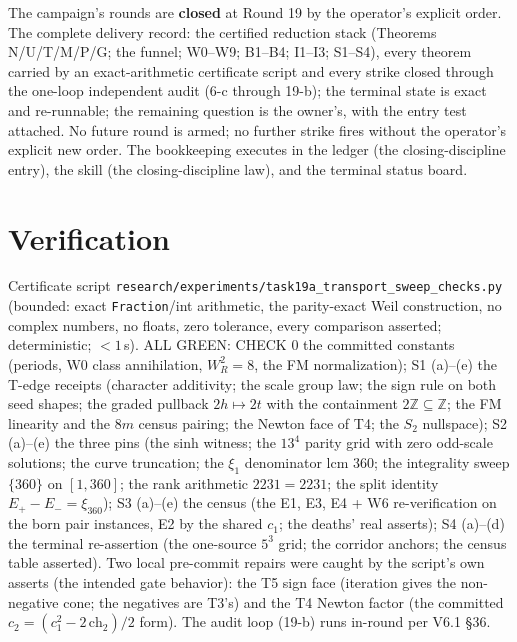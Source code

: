 \documentclass[11pt]{article}
\begin{document}
The campaign's rounds are \textbf{closed} at Round 19 by the operator's
explicit order. The complete delivery record: the certified reduction stack
(Theorems N/U/T/M/P/G; the funnel; W0--W9; B1--B4; I1--I3; S1--S4), every
theorem carried by an exact-arithmetic certificate script and every strike
closed through the one-loop independent audit (6-c through 19-b); the
terminal state is exact and re-runnable; the remaining question is the
owner's, with the entry test attached. No future round is armed; no further
strike fires without the operator's explicit new order. The bookkeeping
 executes in the ledger (the closing-discipline entry), the skill (the
closing-discipline law), and the terminal status board.

\section{Verification}

Certificate script
\texttt{research/experiments/task19a\_transport\_sweep\_checks.py}
(bounded: exact \texttt{Fraction}/int arithmetic, the parity-exact Weil
construction, no complex numbers, no floats, zero tolerance, every comparison
asserted; deterministic; $<1$\,s). ALL GREEN: CHECK 0 the committed constants
(periods, W0 class annihilation, $W_R^2=8$, the FM normalization); S1 (a)--(e)
the T-edge receipts (character additivity; the scale group law; the sign rule
on both seed shapes; the graded pullback $2h\mapsto2t$ with the containment
$2\mathbb Z\subseteq\mathbb Z$; the FM linearity and the $8m$ census pairing;
the Newton face of T4; the $S_2$ nullspace); S2 (a)--(e) the three pins (the
sinh witness; the $13^4$ parity grid with zero odd-scale solutions; the curve
truncation; the $\xi_1$ denominator lcm $360$; the integrality sweep
$\{360\}$ on $[1,360]$; the rank arithmetic $2231=2231$; the split identity
$E_+-E_-=\xi_{360}$); S3 (a)--(e) the census (the E1, E3, E4 + W6 re-verification on
the born pair instances, E2 by the shared $c_1$; the deaths' real asserts); S4 (a)--(d) the terminal
re-assertion (the one-source $5^3$ grid; the corridor anchors; the census
table asserted). Two local pre-commit repairs were caught by the script's own
asserts (the intended gate behavior): the T5 sign face (iteration gives the
non-negative cone; the negatives are T3's) and the T4 Newton factor (the
committed $c_2=(c_1^2-2\,\mathrm{ch}_2)/2$ form). The audit loop (19-b) runs
in-round per V6.1 \S36.
\end{document}
